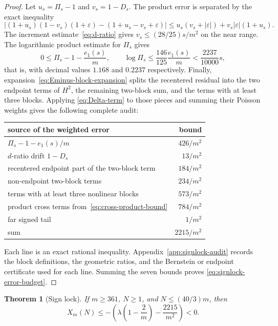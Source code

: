 \documentclass[11pt]{article}
\newtheorem{theorem}{Theorem}[section]
\theoremstyle{definition}
\theoremstyle{remark}
\begin{document}
\begin{proof}
Let $u_s=\Pi_s-1$ and $v_s=1-D_s$.  The product error is separated by the
exact inequality
\begin{equation}\label{eq:cross-product-bound}
 |(1+u_s)(1-v_s)(1+\varepsilon)-
   (1+u_s-v_s+\varepsilon)|
 \le u_s(v_s+|\varepsilon|)+v_s|\varepsilon|(1+u_s).
\end{equation}
The increment estimate~\eqref{eq:d-ratio} gives
$v_s\le(28/25)s/m^2$ on the near range.  The logarithmic product estimate for
$\Pi_s$ gives
\[
 0\le\Pi_s-1-\frac{e_1(s)}m,
 \qquad
 \log\Pi_s\le\frac{146}{125}\frac{e_1(s)}m
  <\frac{2237}{10000}s,
\]
that is, with decimal values $1.168$ and $0.2237$ respectively.  Finally, expansion~\eqref{eq:Eminus-block-expansion}
splits the recentered residual into the two endpoint terms of $H^2$, the
remaining two-block sum, and the terms with at least three blocks.  Applying
\eqref{eq:Delta-term} to those pieces and summing their Poisson weights gives
the following complete audit:
\begin{center}
\begin{tabular}{p{}r}
\toprule
source of the weighted error & bound\\
\midrule
$\Pi_s-1-e_1(s)/m$ & $426/m^2$\\
$d$-ratio drift $1-D_s$ & $13/m^2$\\
recentered endpoint part of the two-block term & $184/m^2$\\
non-endpoint two-block terms & $234/m^2$\\
terms with at least three nonlinear blocks & $573/m^2$\\
product cross terms from~\eqref{eq:cross-product-bound} & $784/m^2$\\
far signed tail & $1/m^2$\\
\midrule
sum & $2215/m^2$\\
\bottomrule
\end{tabular}
\end{center}
Each line is an exact rational inequality.  Appendix~\ref{app:signlock-audit}
records the block definitions, the geometric ratios, and the Bernstein or
endpoint certificate used for each line.  Summing the seven bounds proves
\eqref{eq:signlock-error-budget}.
\end{proof}

\begin{theorem}[Sign lock]\label{thm:signlock}
If $m\ge361$, $N\ge1$, and $N\le(40/3)m$, then
\begin{equation}\label{eq:signlock}
 X_m(N)\le-
 \left(\lambda\left(1-\frac2m\right)-\frac{2215}{m^2}\right)<0.
\end{equation}
\end{theorem}
\end{document}
